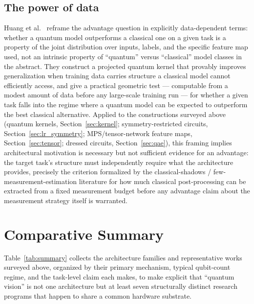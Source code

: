 \documentclass[11pt]{article}
\begin{document}
\subsection{The power of data}
Huang et al.\ \cite{Huang2021PowerData} reframe the advantage question in explicitly data-dependent terms: whether a quantum model outperforms a classical one on a given task is a property of the joint distribution over inputs, labels, and the specific feature map used, not an intrinsic property of ``quantum'' versus ``classical'' model classes in the abstract. They construct a projected quantum kernel that provably improves generalization when training data carries structure a classical model cannot efficiently access, and give a practical geometric test — computable from a modest amount of data before any large-scale training run — for whether a given task falls into the regime where a quantum model can be expected to outperform the best classical alternative. Applied to the constructions surveyed above (quantum kernels, Section~\ref{sec:kernel}; symmetry-restricted circuits, Section~\ref{sec:lr_symmetry}; MPS/tensor-network feature maps, Section~\ref{sec:tensor}; dressed circuits, Section~\ref{sec:qae}), this framing implies architectural motivation is necessary but not sufficient evidence for an advantage: the target task's structure must independently require what the architecture provides, precisely the criterion formalized by the classical-shadows / few-measurement-estimation literature \cite{Huang2020Shadows} for how much classical post-processing can be extracted from a fixed measurement budget before any advantage claim about the measurement strategy itself is warranted.

\section{Comparative Summary}
\label{sec:summary}
Table~\ref{tab:summary} collects the architecture families and representative works surveyed above, organized by their primary mechanism, typical qubit-count regime, and the task-level claim each makes, to make explicit that ``quantum vision'' is not one architecture but at least seven structurally distinct research programs that happen to share a common hardware substrate.
\end{document}
